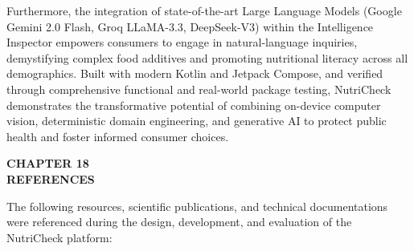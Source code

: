\documentclass[12pt]{article}
\begin{document}
\vspace{0.3cm}

\noindent
Furthermore, the integration of state-of-the-art Large Language Models (Google Gemini 2.0 Flash, Groq LLaMA-3.3, DeepSeek-V3) within the Intelligence Inspector empowers consumers to engage in natural-language inquiries, demystifying complex food additives and promoting nutritional literacy across all demographics. Built with modern Kotlin and Jetpack Compose, and verified through comprehensive functional and real-world package testing, NutriCheck demonstrates the transformative potential of combining on-device computer vision, deterministic domain engineering, and generative AI to protect public health and foster informed consumer choices.

\newpage

\begin{center}
\textbf{\Large CHAPTER 18}\\[0.5cm]
\textbf{\Large REFERENCES}\\[1cm]
\end{center}

\noindent
The following resources, scientific publications, and technical documentations were referenced during the design, development, and evaluation of the NutriCheck platform:

\vspace{0.4cm}
\end{document}
